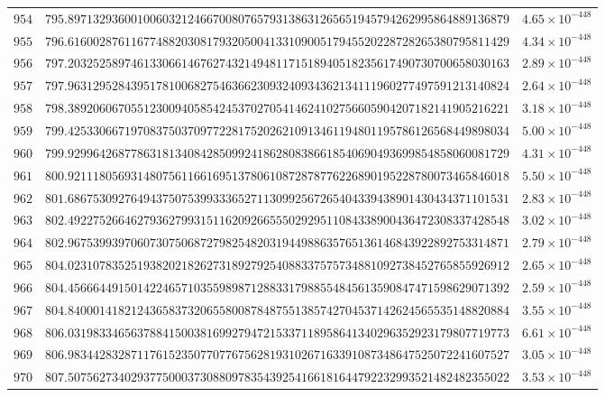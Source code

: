 \documentclass[12pt,reqno]{amsart}
\theoremstyle{remark}
\begin{document}
\begin{longtable}{clc}
$954$ & $795.8971329360010060321246670080765793138631265651945794262995864889136879$ & $4.65\times 10^{-448}$ \\
$955$ & $796.6160028761167748820308179320500413310900517945520228728265380795811429$ & $4.34\times 10^{-448}$ \\
$956$ & $797.2032525897461330661467627432149481171518940518235617490730700658030163$ & $2.89\times 10^{-448}$ \\
$957$ & $797.9631295284395178100682754636623093240934362134111960277497591213140824$ & $2.64\times 10^{-448}$ \\
$958$ & $798.3892060670551230094058542453702705414624102756605904207182141905216221$ & $3.18\times 10^{-448}$ \\
$959$ & $799.4253306671970837503709772281752026210913461194801195786126568449898034$ & $5.00\times 10^{-448}$ \\
$960$ & $799.9299642687786318134084285099241862808386618540690493699854858060081729$ & $4.31\times 10^{-448}$ \\
$961$ & $800.9211180569314807561166169513780610872878776226890195228780073465846018$ & $5.50\times 10^{-448}$ \\
$962$ & $801.6867530927649437507539933365271130992567265404339438901430434371101531$ & $2.83\times 10^{-448}$ \\
$963$ & $802.4922752664627936279931511620926655502929511084338900436472308337428548$ & $3.02\times 10^{-448}$ \\
$964$ & $802.9675399397060730750687279825482031944988635765136146843922892753314871$ & $2.79\times 10^{-448}$ \\
$965$ & $804.0231078352519382021826273189279254088337575734881092738452765855926912$ & $2.65\times 10^{-448}$ \\
$966$ & $804.4566644915014224657103559898712883317988554845613590847471598629071392$ & $2.59\times 10^{-448}$ \\
$967$ & $804.8400014182124365837320655800878487551385742704537142624565535148820884$ & $3.55\times 10^{-448}$ \\
$968$ & $806.0319833465637884150038169927947215337118958641340296352923179807719773$ & $6.61\times 10^{-448}$ \\
$969$ & $806.9834428328711761523507707767562819310267163391087348647525072241607527$ & $3.05\times 10^{-448}$ \\
$970$ & $807.5075627340293775000373088097835439254166181644792232993521482482355022$ & $3.53\times 10^{-448}$ \\

\end{longtable}
\end{document}

